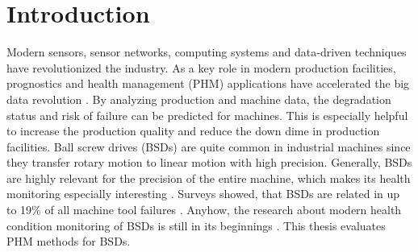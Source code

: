 
\chapter{Introduction}
Modern sensors, sensor networks, computing systems and data-driven techniques have revolutionized the industry. As a key role in modern production facilities, prognostics and health management (PHM) applications have accelerated the big data revolution \cite{ZHAO2019213}. By analyzing production and machine data, the degradation status and risk of failure can be predicted for machines. This is especially helpful to increase the production quality and reduce the down dime in production facilities. Ball screw drives (BSDs) are quite common in industrial machines since they transfer rotary motion to linear motion with high precision. Generally, BSDs are highly relevant for the precision of the entire machine, which makes its health monitoring especially interesting \cite{LiPin2018}. Surveys showed, that BSDs are related in up to 19\% of all machine tool failures \cite{Denkena2021}. Anyhow, the research about modern health condition monitoring of BSDs is still in its beginnings \cite{LiPin2018}. This thesis evaluates PHM methods for BSDs.


